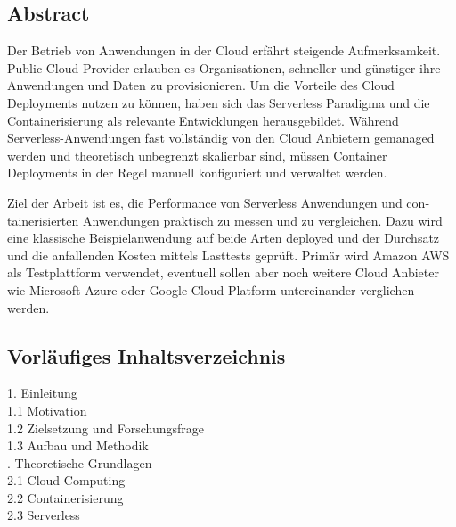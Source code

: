 

\begin{otherlanguage}{american}
\chapter*{Abstract}
Der Betrieb von Anwendungen in der Cloud erfährt steigende Aufmerksamkeit. Public Cloud Provider erlauben es Organisationen, schneller und günstiger ihre Anwendungen und Daten zu provisionieren. Um die Vorteile des Cloud Deployments nutzen zu können, haben sich das Serverless Paradigma und die Containerisierung als relevante Entwicklungen herausgebildet. Während Serverless-Anwendungen fast vollständig von den Cloud Anbietern gemanaged werden und theoretisch unbegrenzt skalierbar sind, müssen Container Deployments in der Regel manuell konfiguriert und verwaltet werden. 

Ziel der Arbeit ist es, die Performance von Serverless Anwendungen und containerisierten Anwendungen praktisch zu messen und zu vergleichen. Dazu wird eine klassische Beispielanwendung auf beide Arten deployed und der Durchsatz und die anfallenden Kosten mittels Lasttests geprüft.
Primär wird Amazon AWS als Testplattform verwendet, eventuell sollen aber noch weitere Cloud Anbieter wie Microsoft Azure oder Google Cloud Platform untereinander verglichen werden.

\section{Vorläufiges Inhaltsverzeichnis}

1. Einleitung\\
\hspace*{0.5cm}1.1 Motivation\\
\hspace*{0.5cm}1.2 Zielsetzung und Forschungsfrage\\
\hspace*{0.5cm}1.3 Aufbau und Methodik\\
   
. Theoretische Grundlagen\\
\hspace*{0.5cm}2.1 Cloud Computing\\
\hspace*{0.5cm}2.2 Containerisierung\\
\hspace*{0.5cm}2.3 Serverless\\
   

\end{otherlanguage}
